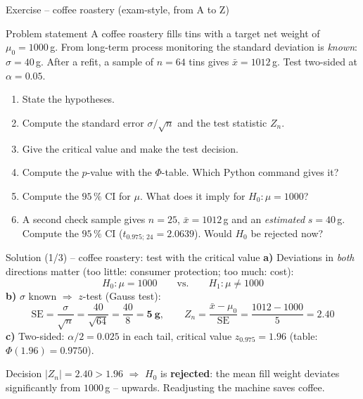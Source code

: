\documentclass[aspectratio=169,11pt]{beamer}
\begin{document}
\begin{frame}{Exercise -- coffee roastery (exam-style, from A to Z)}
  \begin{block}{Problem statement}
    A coffee roastery fills tins with a target net weight of
    $\mu_0=1000$\,g. From long-term process monitoring the standard deviation
    is \emph{known}: $\sigma=40$\,g. After a refit, a sample of $n=64$ tins
    gives $\bar x=1012$\,g. Test two-sided at $\alpha=0.05$.
  \end{block}
  \begin{enumerate}\setlength{\itemsep}{1pt}
    \item[a)] State the hypotheses.
    \item[b)] Compute the standard error $\sigma/\sqrt n$ and the test
              statistic $Z_n$.
    \item[c)] Give the critical value and make the test decision.
    \item[d)] Compute the $p$-value with the $\Phi$-table. Which Python command
              gives it?
    \item[e)] Compute the $95\,\%$ CI for $\mu$. What does it imply for
              $H_0:\mu=1000$?
    \item[f)] A second check sample gives $n=25$, $\bar x=1012$\,g and an
              \emph{estimated} $s=40$\,g. Compute the $95\,\%$ CI
              ($t_{0.975;\,24}=2.0639$). Would $H_0$ be rejected now?
  \end{enumerate}
\end{frame}

\begin{frame}{Solution (1/3) -- coffee roastery: test with the critical value}
  \textbf{a)} Deviations in \emph{both} directions matter (too little:
  consumer protection; too much: cost):
  \[
    H_0:\mu=1000 \qquad\text{vs.}\qquad H_1:\mu\neq1000
  \]
  \textbf{b)} $\sigma$ known $\Rightarrow$ $z$-test (Gauss test):
  \[
    \mathrm{SE}=\frac{\sigma}{\sqrt n}=\frac{40}{\sqrt{64}}=\frac{40}{8}=\mathbf{5\ g},
    \qquad
    Z_n=\frac{\bar x-\mu_0}{\mathrm{SE}}=\frac{1012-1000}{5}=\mathbf{2.40}
  \]
  \textbf{c)} Two-sided: $\alpha/2=0.025$ in each tail, critical value
  $z_{0.975}=1.96$ (table: $\Phi(1.96)=0.9750$).
  \begin{alertblock}{Decision}
    $|Z_n|=2.40>1.96$ $\Rightarrow$ $H_0$ is \textbf{rejected}: the mean fill
    weight deviates significantly from $1000$\,g -- upwards. Readjusting the
    machine saves coffee.
  \end{alertblock}
\end{frame}
\end{document}
